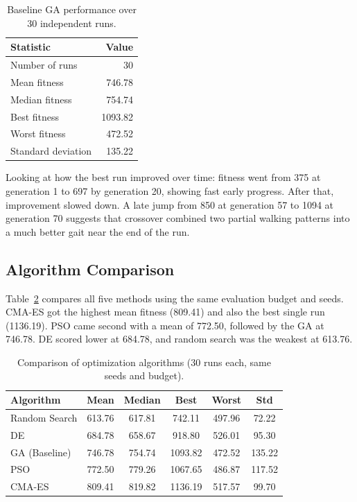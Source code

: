 \documentclass[11pt,a4paper]{article}
\begin{document}
\begin{table}[H]
\centering
\caption{Baseline GA performance over 30 independent runs.}
\label{tab:results}
\small
\begin{tabular}{@{}lr@{}}
\toprule
\textbf{Statistic} & \textbf{Value} \\
\midrule
Number of runs      & 30 \\
Mean fitness        & 746.78 \\
Median fitness      & 754.74 \\
Best fitness        & 1093.82 \\
Worst fitness       & 472.52 \\
Standard deviation  & 135.22 \\
\bottomrule
\end{tabular}
\end{table}

Looking at how the best run improved over time: fitness went from 375 at generation 1 to 697 by generation 20, showing fast early progress. After that, improvement slowed down. A late jump from 850 at generation 57 to 1094 at generation 70 suggests that crossover combined two partial walking patterns into a much better gait near the end of the run.

\subsection{Algorithm Comparison}

Table~\ref{tab:comparison} compares all five methods using the same evaluation budget and seeds. CMA-ES got the highest mean fitness (809.41) and also the best single run (1136.19). PSO came second with a mean of 772.50, followed by the GA at 746.78. DE scored lower at 684.78, and random search was the weakest at 613.76.

\begin{table}[H]
\centering
\caption{Comparison of optimization algorithms (30 runs each, same seeds and budget).}
\label{tab:comparison}
\small
\begin{tabular}{@{}lccccc@{}}
\toprule
\textbf{Algorithm} & \textbf{Mean} & \textbf{Median} & \textbf{Best} & \textbf{Worst} & \textbf{Std} \\
\midrule
Random Search  & 613.76 & 617.81 &  742.11 & 497.96 &  72.22 \\
DE             & 684.78 & 658.67 &  918.80 & 526.01 &  95.30 \\
GA (Baseline)  & 746.78 & 754.74 & 1093.82 & 472.52 & 135.22 \\
PSO            & 772.50 & 779.26 & 1067.65 & 486.87 & 117.52 \\
CMA-ES         & 809.41 & 819.82 & 1136.19 & 517.57 &  99.70 \\
\bottomrule
\end{tabular}
\end{table}
\end{document}
